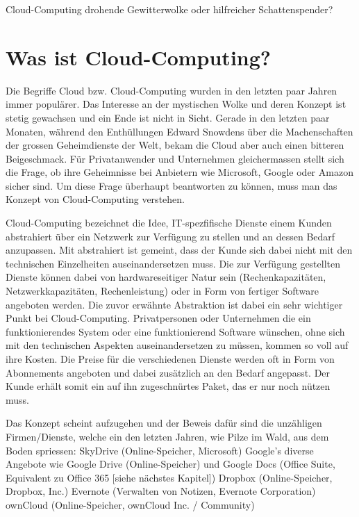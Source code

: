 Cloud-Computing \- drohende Gewitterwolke oder hilfreicher Schattenspender?

\section{Was ist Cloud-Computing?}

Die Begriffe Cloud bzw. Cloud-Computing wurden in den letzten paar Jahren immer populärer. Das Interesse an der mystischen Wolke und deren Konzept ist stetig gewachsen und ein Ende ist nicht in Sicht. Gerade in den letzten paar Monaten, während den Enthüllungen Edward Snowdens über die Machenschaften der grossen Geheimdienste der Welt, bekam die Cloud aber auch einen bitteren Beigeschmack. Für Privatanwender und Unternehmen gleichermassen stellt sich die Frage, ob ihre Geheimnisse bei Anbietern wie Microsoft, Google oder Amazon sicher sind. Um diese Frage überhaupt beantworten zu können, muss man das Konzept von Cloud-Computing verstehen.

Cloud-Computing bezeichnet die Idee, IT-spezfifische Dienste einem Kunden abstrahiert über ein Netzwerk zur Verfügung zu stellen und an dessen Bedarf anzupassen. Mit abstrahiert ist gemeint, dass der Kunde sich dabei nicht mit den technischen Einzelheiten auseinandersetzen muss. Die zur Verfügung gestellten Dienste können dabei von hardwareseitiger Natur sein (Rechenkapazitäten, Netzwerkkapazitäten, Rechenleistung) oder in Form von fertiger Software angeboten werden. Die zuvor erwähnte Abstraktion ist dabei ein sehr wichtiger Punkt bei Cloud-Computing. Privatpersonen oder Unternehmen die ein funktionierendes System oder eine funktionierend Software wünschen, ohne sich mit den technischen Aspekten auseinandersetzen zu müssen, kommen so voll auf ihre Kosten. Die Preise für die verschiedenen Dienste werden oft in Form von Abonnements angeboten und dabei zusätzlich an den Bedarf angepasst. Der Kunde erhält somit ein auf ihn zugeschnürtes Paket, das er nur noch nützen muss.

Das Konzept scheint aufzugehen und der Beweis dafür sind die unzähligen Firmen/Dienste, welche ein den letzten Jahren, wie Pilze im Wald, aus dem Boden spriessen:
SkyDrive (Online-Speicher, Microsoft)
  Google's diverse Angebote wie Google Drive (Online-Speicher) und Google Docs (Office Suite, Equivalent zu Office 365 [siehe nächstes Kapitel])
  Dropbox (Online-Speicher, Dropbox, Inc.)
  Evernote (Verwalten von Notizen, Evernote Corporation)
ownCloud (Online-Speicher, ownCloud Inc. / Community)

